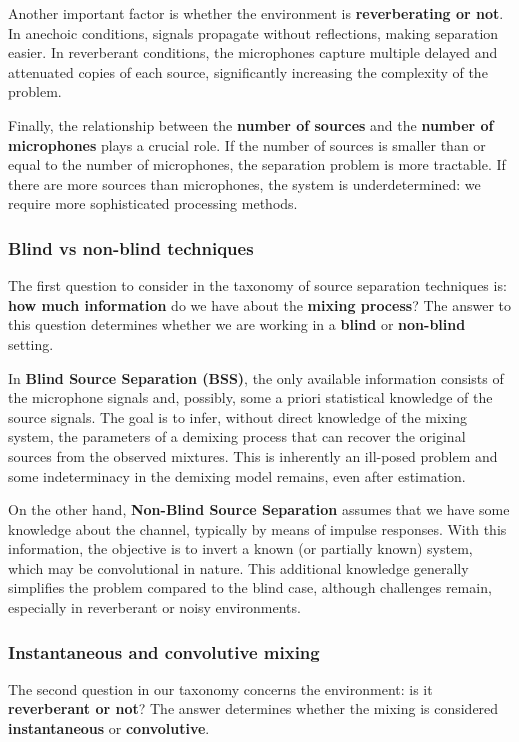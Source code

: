 Another important factor is whether the environment is \textbf{reverberating or not}.  
In anechoic conditions, signals propagate without reflections, making separation easier.
In reverberant conditions, the microphones capture multiple delayed and attenuated copies of each source, significantly increasing the complexity of the problem.

Finally, the relationship between the \textbf{number of sources} and the \textbf{number of microphones} plays a crucial role.  
If the number of sources is smaller than or equal to the number of microphones, the separation problem is more tractable.  
If there are more sources than microphones, the system is underdetermined: we require more sophisticated processing methods.

\subsubsection{Blind vs non-blind techniques}
The first question to consider in the taxonomy of source separation techniques is: \textbf{how much information} do we have about the \textbf{mixing process}?
The answer to this question determines whether we are working in a \textbf{blind} or \textbf{non-blind} setting.

In \textbf{Blind Source Separation (BSS)}, the only available information consists of the microphone signals and, possibly, some a priori statistical knowledge of the source signals.
The goal is to infer, without direct knowledge of the mixing system, the parameters of a demixing process that can recover the original sources from the observed mixtures.
This is inherently an ill-posed problem and some indeterminacy in the demixing model remains, even after estimation.

On the other hand, \textbf{Non-Blind Source Separation} assumes that we have some knowledge about the channel, typically by means of impulse responses.
With this information, the objective is to invert a known (or partially known) system, which may be convolutional in nature.
This additional knowledge generally simplifies the problem compared to the blind case, although challenges remain, especially in reverberant or noisy environments.

\subsubsection{Instantaneous and convolutive mixing}
The second question in our taxonomy concerns the environment: is it \textbf{reverberant or not}?  
The answer determines whether the mixing is considered \textbf{instantaneous} or \textbf{convolutive}.

